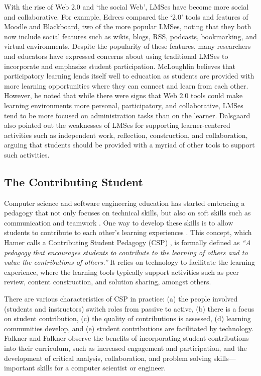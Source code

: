 With the rise of Web 2.0 and `the social Web', LMSes have become more social and collaborative. For example, Edrees \cite{edrees2013elearning} compared the `2.0' tools and features of Moodle and Blackboard, two of the more popular LMSes, noting that they both now include social features such as wikis, blogs, RSS, podcasts, bookmarking, and virtual environments. Despite the popularity of these features, many researchers and educators have expressed concerns about using traditional LMSes to incorporate and emphasize student participation. McLoughlin \cite{mcloughlin2007social} believes that participatory learning lends itself well to education as students are provided with more learning opportunities where they can connect and learn from each other. However, he noted that while there were signs that Web 2.0 tools could make learning environments more personal, participatory, and collaborative, LMSes tend to be more focused on administration tasks than on the learner. Dalsgaard \cite{dalsgaard2006social} also pointed out the weaknesses of LMSes for supporting learner-centered activities such as independent work, reflection, construction, and collaboration, arguing that students should be provided with a myriad of other tools to support such activities.

\subsection{The Contributing Student}
Computer science and software engineering education has started embracing a pedagogy that not only focuses on technical skills, but also on soft skills such as communication and teamwork \cite{jazayeri2004education}. One way to develop these skills is to allow students to contribute to each other's learning experiences \cite{hamer2006some}. This concept, which Hamer calls a Contributing Student Pedagogy (CSP) \cite{hamer2008contributing}, is formally defined as \textit{``A pedagogy that encourages students to contribute to the learning of others and to value the contributions of others.''} It relies on technology to facilitate the learning experience, where the learning tools typically support activities such as peer review, content construction, and solution sharing, amongst others.

There are various characteristics of CSP in practice: (a) the people involved (students and instructors) switch roles from passive to active, (b) there is a focus on student contribution, (c) the quality of contributions is assessed, (d) learning communities develop, and (e) student contributions are facilitated by technology. Falkner and Falkner \cite{falkner2012supporting} observe the benefits of incorporating student contributions into their curriculum, such as increased engagement and participation, and the development of critical analysis, collaboration, and problem solving skills---important skills for a computer scientist or engineer.


